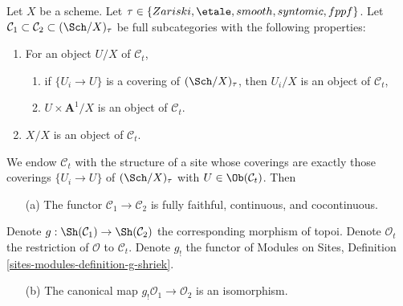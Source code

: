 \begin{lemma}
\label{lemma-compare-structure-sheaves}
Let $X$ be a scheme. Let
$\tau \in \{Zariski, \etale, smooth, syntomic, fppf\}$.
Let $\mathcal{C}_1 \subset \mathcal{C}_2 \subset (\Sch/X)_\tau$ be full
subcategories with the following properties:
\begin{enumerate}
\item For an object $U/X$ of $\mathcal{C}_t$,
\begin{enumerate}
\item if $\{U_i \to U\}$ is a covering of $(\Sch/X)_\tau$, then
$U_i/X$ is an object of $\mathcal{C}_t$,
\item $U \times \mathbf{A}^1/X$ is an object of $\mathcal{C}_t$.
\end{enumerate}
\item $X/X$ is an object of $\mathcal{C}_t$.
\end{enumerate}
We endow $\mathcal{C}_t$ with the structure of a site whose coverings are
exactly those coverings $\{U_i \to U\}$ of $(\Sch/X)_\tau$ with
$U \in \Ob(\mathcal{C}_t)$. Then
\begin{enumerate}
\item[(a)] The functor $\mathcal{C}_1 \to \mathcal{C}_2$
is fully faithful, continuous, and cocontinuous.
\end{enumerate}
Denote $g : \Sh(\mathcal{C}_1) \to \Sh(\mathcal{C}_2)$ the corresponding
morphism of topoi. Denote $\mathcal{O}_t$ the restriction of $\mathcal{O}$
to $\mathcal{C}_t$. Denote $g_!$ the functor of
Modules on Sites, Definition \ref{sites-modules-definition-g-shriek}.
\begin{enumerate}
\item[(b)] The canonical map $g_!\mathcal{O}_1 \to \mathcal{O}_2$
is an isomorphism.
\end{enumerate}
\end{lemma}


